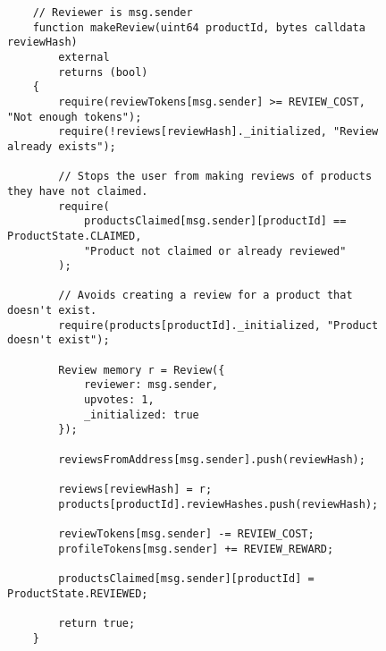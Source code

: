 \begin{figure}[H]
    \begin{verbatim}
    // Reviewer is msg.sender
    function makeReview(uint64 productId, bytes calldata reviewHash)
        external
        returns (bool)
    {
        require(reviewTokens[msg.sender] >= REVIEW_COST, "Not enough tokens");
        require(!reviews[reviewHash]._initialized, "Review already exists");

        // Stops the user from making reviews of products they have not claimed.
        require(
            productsClaimed[msg.sender][productId] == ProductState.CLAIMED,
            "Product not claimed or already reviewed"
        );

        // Avoids creating a review for a product that doesn't exist.
        require(products[productId]._initialized, "Product doesn't exist");

        Review memory r = Review({
            reviewer: msg.sender,
            upvotes: 1,
            _initialized: true
        });

        reviewsFromAddress[msg.sender].push(reviewHash);

        reviews[reviewHash] = r;
        products[productId].reviewHashes.push(reviewHash);

        reviewTokens[msg.sender] -= REVIEW_COST;
        profileTokens[msg.sender] += REVIEW_REWARD;

        productsClaimed[msg.sender][productId] = ProductState.REVIEWED;

        return true;
    }
    \end{verbatim}
    \label{code:}
    \caption{}
\end{figure}

